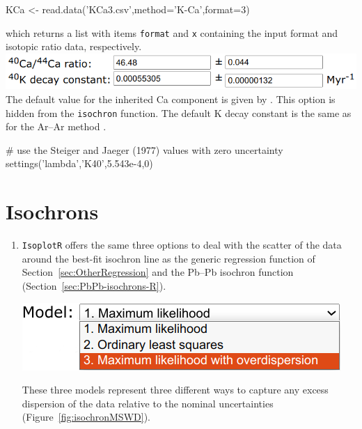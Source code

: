 \begin{refsection}
\begin{script}
KCa <- read.data('KCa3.csv',method='K-Ca',format=3)
\end{script}

\noindent which returns a list with items \texttt{format} and
\texttt{x} containing the input format and isotopic ratio data,
respectively.\\

\noindent\includegraphics[width=.7\linewidth]{../figures/KCaLambda.png}\\

\noindent The default value for the inherited Ca component is given by
\citet{moore1972}. This option is hidden from the \texttt{isochron}
function. The default K decay constant is the same as for the Ar--Ar
method \citep{renne2011}.

\begin{script}
# use the Steiger and Jaeger (1977) values with zero uncertainty
settings('lambda','K40',5.543e-4,0)
\end{script}

\section{Isochrons}\label{sec:ArAr-isochrons-R}

\begin{enumerate}

\item \texttt{IsoplotR} offers the same three options to deal with the
  scatter of the data around the best-fit isochron line as the generic
  regression function of Section~\ref{sec:OtherRegression} and the
  Pb--Pb isochron function (Section~\ref{sec:PbPb-isochrons-R}).

\noindent\begin{minipage}[t]{.45\linewidth}
\strut\vspace*{-\baselineskip}\newline
\includegraphics[width=\linewidth]{../figures/ArArIsochronModels.png}
\end{minipage}
\begin{minipage}[t]{.55\linewidth}
  These three models represent three different ways to capture any
  excess dispersion of the data relative to the nominal uncertainties
  (Figure~\ref{fig:isochronMSWD}).
\end{minipage}


\end{enumerate}
\end{refsection}
